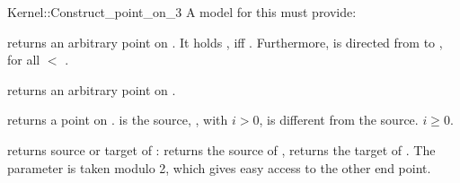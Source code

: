 \begin{ccRefFunctionObjectConcept}{Kernel::Construct_point_on_3}
A model for this must provide:


       {returns an arbitrary point on . It holds 
        , iff .
        Furthermore,  is directed from 
        to , for all  $<$ .}

       {returns an arbitrary point on .}

       {returns a point on .  is the source,
        , with $i>0$, is different from the 
        source. \ccPrecond $i \geq 0$.}

       {returns source or target   of :    returns
        the source of ,  returns the target of .
        The parameter  is taken modulo 2, which gives 
        easy access to the other end point. }

\end{ccRefFunctionObjectConcept}
